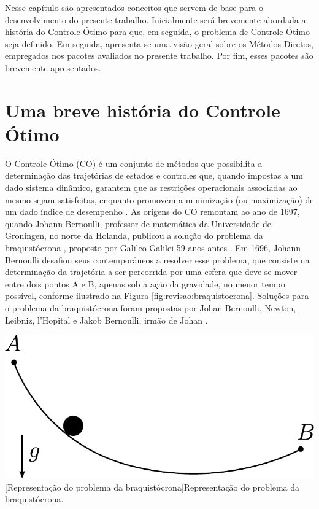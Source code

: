 Nesse capítulo são apresentados conceitos que servem de base para o desenvolvimento do presente trabalho. Inicialmente será brevemente abordada a história do Controle Ótimo para que, em seguida, o problema de Controle Ótimo seja definido. Em seguida, apresenta-se uma visão geral sobre os Métodos Diretos, empregados nos pacotes avaliados no presente trabalho. Por fim, esses pacotes são brevemente apresentados. 
\section{Uma breve história do Controle Ótimo}


O Controle Ótimo (CO) é um conjunto de métodos que possibilita a determinação das trajetórias de estados e controles que, quando impostas a um dado sistema dinâmico, garantem que as restrições operacionais associadas ao mesmo sejam satisfeitas, enquanto promovem a minimização (ou maximização) de um dado índice de desempenho \cite{kirk_optimal_2004, becerra_optimal_2008, kelly_introduction_2017}. As origens do CO remontam ao ano de 1697, quando Johann Bernoulli, professor de matemática da Universidade de Groningen, no norte da Holanda, publicou a solução do problema da braquistócrona \cite{sussmann_300_1997}, proposto por Galileo Galilei 59 anos antes \cite{bryson_optimal_1996}. Em 1696, Johann Bernoulli desafiou seus contemporâneos a resolver esse problema, que consiste na determinação da trajetória a ser percorrida por uma esfera que deve se mover entre dois pontos A e B, apenas sob a ação da gravidade, no menor tempo possível, conforme ilustrado na Figura \ref{fig:revisao:braquistocrona}. Soluções para o problema da braquistócrona foram propostas por Johan Bernoulli, Newton, Leibniz, l'Hopital e Jakob Bernoulli, irmão de Johan \cite{bryson_optimal_1996}.

\noindent	
\begin{minipage}{\textwidth}
	\vspace{\onelineskip}
	\centering
	\includegraphics[width=0.5\linewidth]{draw/revisao/pdf/braq}
	[Representação do problema da braquistócrona]{Representação do problema da braquistócrona.}
	\label{fig:revisao:braquistocrona}
	\vspace{\onelineskip}
\end{minipage}

